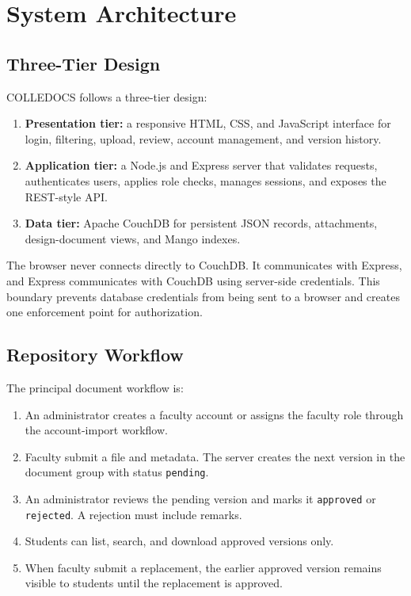 \documentclass[conference]{IEEEtran}
\begin{document}
\section{System Architecture}

\subsection{Three-Tier Design}
COLLEDOCS follows a three-tier design:
\begin{enumerate}
    \item \textbf{Presentation tier:} a responsive HTML, CSS, and JavaScript interface for login, filtering, upload, review, account management, and version history.
    \item \textbf{Application tier:} a Node.js and Express server that validates requests, authenticates users, applies role checks, manages sessions, and exposes the REST-style API.
    \item \textbf{Data tier:} Apache CouchDB for persistent JSON records, attachments, design-document views, and Mango indexes.
\end{enumerate}

The browser never connects directly to CouchDB. It communicates with Express, and Express communicates with CouchDB using server-side credentials. This boundary prevents database credentials from being sent to a browser and creates one enforcement point for authorization.

\subsection{Repository Workflow}
The principal document workflow is:
\begin{enumerate}
    \item An administrator creates a faculty account or assigns the faculty role through the account-import workflow.
    \item Faculty submit a file and metadata. The server creates the next version in the document group with status \texttt{pending}.
    \item An administrator reviews the pending version and marks it \texttt{approved} or \texttt{rejected}. A rejection must include remarks.
    \item Students can list, search, and download approved versions only.
    \item When faculty submit a replacement, the earlier approved version remains visible to students until the replacement is approved.
\end{enumerate}
\end{document}
